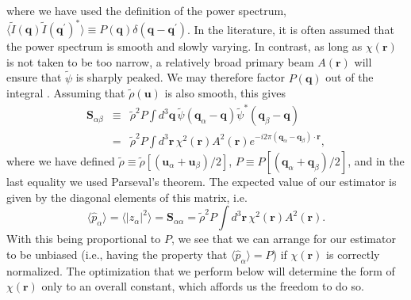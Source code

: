 \documentclass[twocolumn,aps,prd,nofootinbib,showpacs]{revtex4-1}
\begin{document}
where we have used the definition of the power spectrum, $\langle \widetilde{I}(\mathbf{q}) \widetilde{I}(\mathbf{q^\prime})^* \rangle \equiv P(\mathbf{q}) \delta(\mathbf{q} - \mathbf{q}^\prime)$.  In the literature, it is often assumed that the power spectrum is smooth and slowly varying.  In contrast, as long as $\chi (\mathbf{r})$ is not taken to be too narrow, a relatively broad primary beam $A(\mathbf{r})$ will ensure that $\widetilde{\psi}$ is sharply peaked.  We may therefore factor $P(\mathbf{q})$ out of the integral \cite{McQuinn2006,Parsons2012a}.  Assuming that $\tilde{\rho} (\mathbf{u})$ is also smooth, this gives
\begin{eqnarray}
\mathbf{S}_{\alpha \beta} &\equiv& \tilde{\rho}^2 P \int d^3 \mathbf{q} \,\widetilde{\psi}(\mathbf{q}_\alpha - \mathbf{q}) \widetilde{\psi}^*(\mathbf{q}_\beta - \mathbf{q}) \nonumber \\
&=& \tilde{\rho}^2 P \int d^3 \mathbf{r} \, \chi^2 (\mathbf{r}) A^2 (\mathbf{r}) e^{-i 2 \pi (\mathbf{q}_\alpha - \mathbf{q}_\beta) \cdot \mathbf{r}},
\end{eqnarray}
where we have defined $\tilde{\rho} \equiv \tilde{\rho} [(\mathbf{u}_\alpha + \mathbf{u}_\beta)/2]$, $P\equiv P [(\mathbf{q}_\alpha + \mathbf{q}_\beta)/2]$, and in the last equality we used Parseval's theorem.  The expected value of our estimator is given by the diagonal elements of this matrix, i.e.
\begin{equation}
\langle \widehat{p}_\alpha \rangle =  \langle | z_\alpha |^2 \rangle = \mathbf{S}_{\alpha \alpha} = \tilde{\rho}^2 P \int d^3 \mathbf{r} \, \chi^2 (\mathbf{r}) A^2 (\mathbf{r}) .
\end{equation}
With this being proportional to $P$, we see that we can arrange for our estimator to be unbiased (i.e., having the property that $\langle \widehat{p}_\alpha \rangle= P$) if $\chi(\mathbf{r})$ is correctly normalized.  The optimization that we perform below will determine the form of $\chi(\mathbf{r})$ only to an overall constant, which affords us the freedom to do so.
\end{document}
